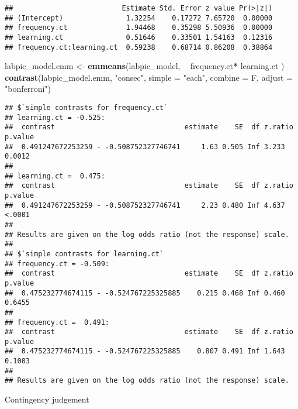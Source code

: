 \documentclass[
]{article}
\newenvironment{Shaded}{\begin{snugshade}}{\end{snugshade}}
\newcommand{\DataTypeTok}[1]{\textcolor[rgb]{0.13,0.29,0.53}{#1}}
\newcommand{\KeywordTok}[1]{\textcolor[rgb]{0.13,0.29,0.53}{\textbf{#1}}}
\newcommand{\NormalTok}[1]{#1}
\newcommand{\OperatorTok}[1]{\textcolor[rgb]{0.81,0.36,0.00}{\textbf{#1}}}
\newcommand{\StringTok}[1]{\textcolor[rgb]{0.31,0.60,0.02}{#1}}
\begin{document}
\begin{verbatim}
##                          Estimate Std. Error z value Pr(>|z|)
## (Intercept)               1.32254    0.17272 7.65720  0.00000
## frequency.ct              1.94468    0.35298 5.50936  0.00000
## learning.ct               0.51646    0.33501 1.54163  0.12316
## frequency.ct:learning.ct  0.59238    0.68714 0.86208  0.38864
\end{verbatim}

\begin{Shaded}
\begin{Highlighting}[]
\NormalTok{labpic_model.emm <-}\StringTok{ }\KeywordTok{emmeans}\NormalTok{(labpic_model, }\OperatorTok{~}\StringTok{ }\NormalTok{frequency.ct}\OperatorTok{*}\StringTok{ }\NormalTok{learning.ct )}
\KeywordTok{contrast}\NormalTok{(labpic_model.emm, }\StringTok{"consec"}\NormalTok{,  }\DataTypeTok{simple =} \StringTok{"each"}\NormalTok{, }\DataTypeTok{combine =}\NormalTok{ F, }\DataTypeTok{adjust =} \StringTok{"bonferroni"}\NormalTok{)}
\end{Highlighting}
\end{Shaded}

\begin{verbatim}
## $`simple contrasts for frequency.ct`
## learning.ct = -0.525:
##  contrast                               estimate    SE  df z.ratio p.value
##  0.491247672253259 - -0.508752327746741     1.63 0.505 Inf 3.233   0.0012 
## 
## learning.ct =  0.475:
##  contrast                               estimate    SE  df z.ratio p.value
##  0.491247672253259 - -0.508752327746741     2.23 0.480 Inf 4.637   <.0001 
## 
## Results are given on the log odds ratio (not the response) scale. 
## 
## $`simple contrasts for learning.ct`
## frequency.ct = -0.509:
##  contrast                               estimate    SE  df z.ratio p.value
##  0.475232774674115 - -0.524767225325885    0.215 0.468 Inf 0.460   0.6455 
## 
## frequency.ct =  0.491:
##  contrast                               estimate    SE  df z.ratio p.value
##  0.475232774674115 - -0.524767225325885    0.807 0.491 Inf 1.643   0.1003 
## 
## Results are given on the log odds ratio (not the response) scale.
\end{verbatim}

Contingency judgement

\begin{Shaded}
\end{Shaded}
\end{document}
